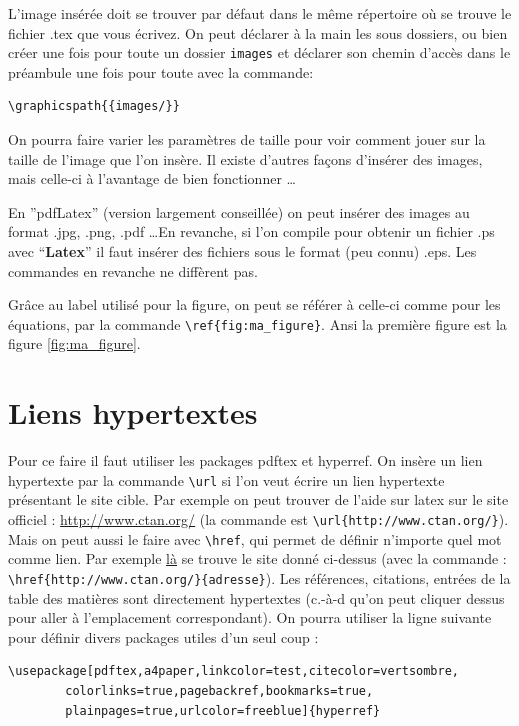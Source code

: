L'image insérée doit se trouver par défaut dans le même répertoire où se trouve le fichier .tex 
que vous écrivez. On peut d\'eclarer \`a la main les sous dossiers, ou bien cr\'eer une fois
pour toute un dossier \lstinline+images+ et d\'eclarer son chemin d'acc\`es dans le préambule
une fois pour toute avec la commande:
\begin{lstlisting}
\graphicspath{{images/}} 
\end{lstlisting}



On pourra faire varier les paramètres de taille pour voir comment jouer sur la 
taille de l'image que l'on insère. Il existe d'autres façons d'insérer des images, mais celle-ci
 à l'avantage de bien fonctionner \ldots \medskip


En ''pdfLatex'' (version largement conseillée)  on peut insérer des images au format .jpg, .png, 
.pdf \ldots En revanche, si l'on compile pour obtenir un fichier .ps avec ``\textbf{Latex}'' il 
faut insérer des fichiers sous le format (peu connu) .eps. Les commandes en revanche ne diffèrent
 pas.\medskip

Grâce au label utilisé pour la figure, on peut se référer  à celle-ci comme pour les équations,
 par la commande \lstinline+\ref{fig:ma_figure}+. Ansi la première figure est la figure \ref{fig:ma_figure}.

\section{Liens hypertextes}

Pour ce faire il faut utiliser les packages pdftex et hyperref.
On insère un lien hypertexte par la commande 
\lstinline+\url+ si l'on veut écrire un lien 
hypertexte présentant le site cible. 
Par exemple on peut trouver de l'aide sur latex sur le site officiel : 
\url{http://www.ctan.org/} (la commande est \lstinline+\url{http://www.ctan.org/}+). 
Mais on peut aussi le faire avec  \lstinline+\href+, qui permet de définir n'importe quel mot 
comme lien. 
Par exemple \href{http://www.ctan.org/}{là} se trouve le site donné ci-dessus 
(avec la commande : \lstinline+\href{http://www.ctan.org/}{adresse}+).  
Les références, citations, entrées de la table des matières sont directement hypertextes 
(c.-à-d qu'on peut cliquer dessus pour aller à l'emplacement correspondant).
On pourra utiliser la ligne suivante pour définir divers packages utiles  d'un seul coup :
\begin{lstlisting}
\usepackage[pdftex,a4paper,linkcolor=test,citecolor=vertsombre,
	    colorlinks=true,pagebackref,bookmarks=true, 
	    plainpages=true,urlcolor=freeblue]{hyperref}
\end{lstlisting}

